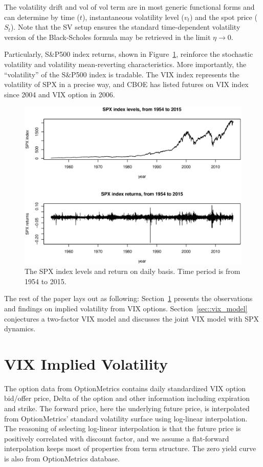 \documentclass[11pt,reqno,final]{amsart}
\begin{document}
The volatility drift and vol of vol term are in most generic functional forms and can determine by time ($t$), instantaneous volatility level ($v_t$) and the spot price ($S_t$). Note that the SV setup ensures the standard time-dependent volatility version of the Black-Scholes formula may be retrieved in the limit $\eta \rightarrow 0$.

Particularly, S\&P500 index returns, shown in Figure~\ref{plot_spx}, reinforce the stochastic volatility and volatility mean-reverting characteristics. More importantly, the ``volatility'' of the S\&P500 index is tradable. The VIX index represents the volatility of SPX in a precise way, and CBOE has listed futures on VIX index since 2004 and VIX option in 2006.

\begin{figure}[H]
  \centering
  \includegraphics[scale=0.6]{spx_index_return.eps}
  \caption{The SPX index levels and return on daily basis. Time period is from 1954 to 2015.}\label{plot_spx}
\end{figure}

The rest of the paper lays out as following: Section~\ref{sec::vix_smile} presents the observations and findings on implied volatility from VIX options. Section~\ref{sec::vix_model} conjectures a two-factor VIX model and discusses the joint VIX model with SPX dynamics.

\bigskip

\section{VIX Implied Volatility} \label{sec::vix_smile}
The option data from OptionMetrics contains daily standardized VIX option bid/offer price, Delta of the option and other information including expiration and strike. The forward price, here the underlying future price, is interpolated from OptionMetrics' standard volatility surface using log-linear interpolation. The reasoning of selecting log-linear interpolation is that the future price is positively correlated with discount factor, and we assume a flat-forward interpolation keeps most of properties from term structure. The zero yield curve is also from OptionMetrics database.
\end{document}
